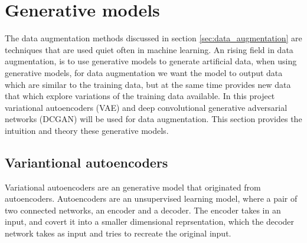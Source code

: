 \documentclass[11pt]{article}
\begin{document}
\section{Generative models}\label{sec:generative_models}

The data augmentation methods discussed in section \ref{sec:data_augmentation} are techniques that are used quiet often in machine learning. An rising field in data augmentation, is to use generative models to generate artificial data, when using generative models, for data augmentation we want the model to output data which are similar to the training data, but at the same time provides new data that which explore variations of the training data available.
In this project variational autoencoders (VAE) and deep convolutional generative adversarial networks (DCGAN) will be used for data augmentation. This section provides the intuition and theory these generative models.

\subsection{Variantional autoencoders}\label{sec:generative_models_vae}

Variational autoencoders are an generative model that originated from autoencoders. Autoencoders are an unsupervised learning model, where a pair of two connected networks, an encoder and a decoder. The encoder takes in an input, and covert it into a smaller dimensional reprsentation, which the decoder network takes as input and tries to recreate the original input.
\end{document}
